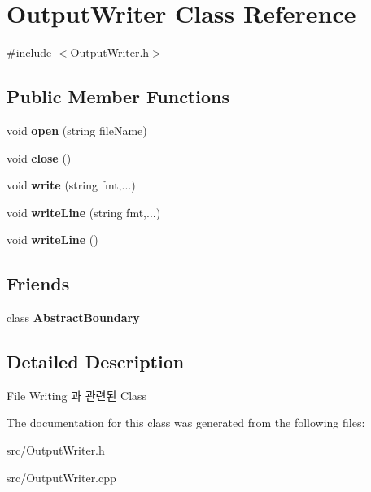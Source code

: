 \hypertarget{class_output_writer}{}\section{Output\+Writer Class Reference}
\label{class_output_writer}


{\ttfamily \#include $<$Output\+Writer.\+h$>$}

\subsection*{Public Member Functions}
\begin{DoxyCompactItemize}
\item 
\mbox{\label{class_output_writer_a33a96359971dfce8fafdebac909bdd08}} 
void {\bfseries open} (string file\+Name)
\item 
\mbox{\label{class_output_writer_ab802980c4b874cb35ae744a170b5fd89}} 
void {\bfseries close} ()
\item 
\mbox{\label{class_output_writer_a6f4f8d99eca724f6fcbb60bcb950a4e9}} 
void {\bfseries write} (string fmt,...)
\item 
\mbox{\label{class_output_writer_a17a9fd09b2241b8440ba24057e97e621}} 
void {\bfseries write\+Line} (string fmt,...)
\item 
\mbox{\label{class_output_writer_a6affce047db6e83ac534488e90462047}} 
void {\bfseries write\+Line} ()
\end{DoxyCompactItemize}
\subsection*{Friends}
\begin{DoxyCompactItemize}
\item 
\mbox{\label{class_output_writer_a184f0c3382d2d98357915f83d1d821c6}} 
class {\bfseries Abstract\+Boundary}
\end{DoxyCompactItemize}


\subsection{Detailed Description}
File Writing 과 관련된 Class 

The documentation for this class was generated from the following files\+:\begin{DoxyCompactItemize}
\item 
src/Output\+Writer.\+h\item 
src/Output\+Writer.\+cpp\end{DoxyCompactItemize}
